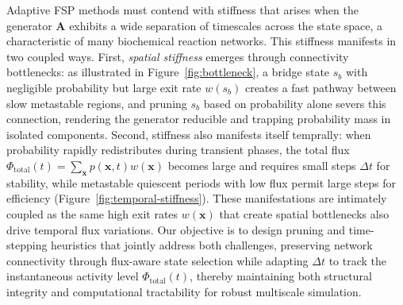 \documentclass[review,onefignum,onetabnum]{siamart171218}
\begin{document}
\begin{remark}
\label{rem:stiffness-challenges}
Adaptive FSP methods must contend with stiffness that arises when the generator $\mathbf{A}$ exhibits a wide separation of timescales across the state space, a characteristic of many biochemical reaction networks. This stiffness manifests in two coupled ways. First, \textit{spatial stiffness} emerges through connectivity bottlenecks: as illustrated in Figure~\ref{fig:bottleneck}, a bridge state $s_b$ with negligible probability but large exit rate $w(s_b)$ creates a fast pathway between slow metastable regions, and pruning $s_b$ based on probability alone severs this connection, rendering the generator reducible and trapping probability mass in isolated components. Second, stiffness also manifests itself temprally: when probability rapidly redistributes during transient phases, the total flux $\Phi_{\mathrm{total}}(t) = \sum_{\boldsymbol{x}} p(\boldsymbol{x},t) w(\boldsymbol{x})$ becomes large and requires small steps $\Delta t$ for stability, while metastable quiescent periods with low flux permit large steps for efficiency (Figure~\ref{fig:temporal-stiffness}). These manifestations are intimately coupled as the same high exit rates $w(\boldsymbol{x})$ that create spatial bottlenecks also drive temporal flux variations. Our objective is to design pruning and time-stepping heuristics that jointly address both challenges, preserving network connectivity through flux-aware state selection while adapting $\Delta t$ to track the instantaneous activity level $\Phi_{\mathrm{total}}(t)$, thereby maintaining both structural integrity and computational tractability for robust multiscale simulation.

\begin{figure}[ht!]
\centering

\begin{subfigure}[b]{0.46\textwidth}
\centering
{}
\end{subfigure}
\end{figure}
\end{remark}
\end{document}
